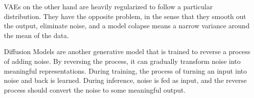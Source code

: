 VAEs on the other hand are heavily regularized to follow a particular distribution. They have the opposite problem, in the sense that they smooth out the output, eliminate noise, and a model colapse means a narrow variance around the mean of the data.

Diffusion Models \cite{sohldickstein2015diffusion, ho2020ddpm} are another generative model that is trained to reverse a process of adding noise. By reversing the process, it can gradually transform noise into meaningful representations. During training, the process of turning an input into noise and back is learned. During inference, noise is fed as input, and the reverse process should convert the noise to some meaningful output.

